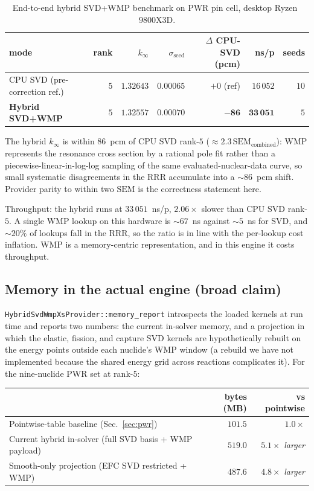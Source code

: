 \documentclass[11pt,a4paper]{article}
\begin{document}
\begin{table}[htb]
\centering
\caption{End-to-end hybrid SVD+WMP benchmark on PWR pin
cell, desktop Ryzen~$9800$X3D.}
\label{tab:hybrid_endtoend}
\begin{tabular}{@{}lrrrrrr@{}}
\toprule
mode & rank & $k_\infty$ & $\sigma_\text{seed}$ &
$\Delta$ CPU-SVD (pcm) & ns/p & seeds \\
\midrule
CPU SVD (pre-correction ref.) & $5$ & $1.32643$ & $0.00065$ & $+0$ (ref) & $16\,052$ & $10$ \\
\textbf{Hybrid SVD+WMP}       & $5$ & $\mathbf{1.32557}$ &
 $\mathbf{0.00070}$ & $\mathbf{-86}$ & $\mathbf{33\,051}$ & $5$ \\
\bottomrule
\end{tabular}
\end{table}

The hybrid $k_\infty$ is within $86$~pcm of CPU SVD rank-$5$
($\approx 2.3\,\mathrm{SEM}_\text{combined}$): WMP represents
the resonance cross section by a rational pole fit rather
than a piecewise-linear-in-log-log sampling of the same
evaluated-nuclear-data curve, so small systematic
disagreements in the RRR accumulate into a
$\sim\!86$~pcm shift. Provider parity to within two
$\mathrm{SEM}$ is the correctness statement here.

Throughput: the hybrid runs at $33\,051$~ns/p, $2.06\times$
slower than CPU SVD rank-$5$. A single WMP lookup on this
hardware is $\sim\!67$~ns against $\sim\!5$~ns for SVD,
and $\sim\!20\%$ of lookups fall in the RRR, so the
ratio is in line with the per-lookup cost inflation.
WMP is a memory-centric representation, and in this engine
it costs throughput.

\subsection{Memory in the actual engine (broad claim)}
\label{sec:hybrid_mem_engine}

\texttt{HybridSvdWmpXsProvider::memory\_report} introspects
the loaded kernels at run time and reports two numbers: the
current in-solver memory, and a projection in which the
elastic, fission, and capture SVD kernels are hypothetically
rebuilt on the energy points outside each nuclide's WMP
window (a rebuild we have not implemented because the shared
energy grid across reactions complicates it). For the
nine-nuclide PWR set at rank-$5$:

\begin{center}
\begin{tabular}{@{}lrr@{}}
\toprule
 & bytes (MB) & vs pointwise \\
\midrule
Pointwise-table baseline (Sec.~\ref{sec:pwr}) & $101.5$ & $1.0\times$ \\
Current hybrid in-solver (full SVD basis + WMP payload) & $519.0$ & $5.1\times$ \emph{larger} \\
Smooth-only projection (EFC SVD restricted + WMP) & $487.6$ & $4.8\times$ \emph{larger} \\
\bottomrule
\end{tabular}
\end{center}
\end{document}
